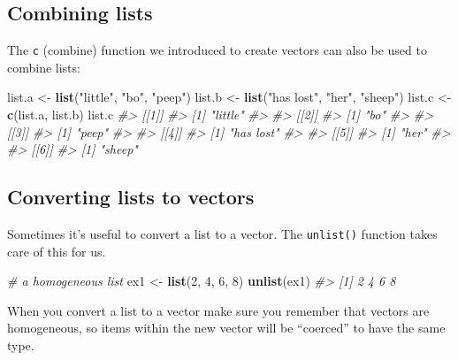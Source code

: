 \documentclass[]{book}
\newenvironment{Shaded}{\begin{snugshade}}{\end{snugshade}}
\newcommand{\CommentTok}[1]{\textcolor[rgb]{0.56,0.35,0.01}{\textit{#1}}}
\newcommand{\DecValTok}[1]{\textcolor[rgb]{0.00,0.00,0.81}{#1}}
\newcommand{\KeywordTok}[1]{\textcolor[rgb]{0.13,0.29,0.53}{\textbf{#1}}}
\newcommand{\NormalTok}[1]{#1}
\newcommand{\StringTok}[1]{\textcolor[rgb]{0.31,0.60,0.02}{#1}}
\theoremstyle{definition}
\theoremstyle{definition}
\theoremstyle{definition}
\theoremstyle{remark}
\begin{document}
\hypertarget{combining-lists}{%
\subsection{Combining lists}\label{combining-lists}}

The \texttt{c} (combine) function we introduced to create vectors can
also be used to combine lists:

\begin{Shaded}
\begin{Highlighting}[]
\NormalTok{list.a <-}\StringTok{ }\KeywordTok{list}\NormalTok{(}\StringTok{"little"}\NormalTok{, }\StringTok{"bo"}\NormalTok{, }\StringTok{"peep"}\NormalTok{)}
\NormalTok{list.b <-}\StringTok{ }\KeywordTok{list}\NormalTok{(}\StringTok{"has lost"}\NormalTok{, }\StringTok{"her"}\NormalTok{, }\StringTok{"sheep"}\NormalTok{)}
\NormalTok{list.c <-}\StringTok{ }\KeywordTok{c}\NormalTok{(list.a, list.b)}
\NormalTok{list.c}
\CommentTok{#> [[1]]}
\CommentTok{#> [1] "little"}
\CommentTok{#> }
\CommentTok{#> [[2]]}
\CommentTok{#> [1] "bo"}
\CommentTok{#> }
\CommentTok{#> [[3]]}
\CommentTok{#> [1] "peep"}
\CommentTok{#> }
\CommentTok{#> [[4]]}
\CommentTok{#> [1] "has lost"}
\CommentTok{#> }
\CommentTok{#> [[5]]}
\CommentTok{#> [1] "her"}
\CommentTok{#> }
\CommentTok{#> [[6]]}
\CommentTok{#> [1] "sheep"}
\end{Highlighting}
\end{Shaded}

\hypertarget{converting-lists-to-vectors}{%
\subsection{Converting lists to
vectors}\label{converting-lists-to-vectors}}

Sometimes it's useful to convert a list to a vector. The
\texttt{unlist()} function takes care of this for us.

\begin{Shaded}
\begin{Highlighting}[]
\CommentTok{# a homogeneous list}
\NormalTok{ex1 <-}\StringTok{ }\KeywordTok{list}\NormalTok{(}\DecValTok{2}\NormalTok{, }\DecValTok{4}\NormalTok{, }\DecValTok{6}\NormalTok{, }\DecValTok{8}\NormalTok{)}
\KeywordTok{unlist}\NormalTok{(ex1)}
\CommentTok{#> [1] 2 4 6 8}
\end{Highlighting}
\end{Shaded}

When you convert a list to a vector make sure you remember that vectors
are homogeneous, so items within the new vector will be ``coerced'' to
have the same type.
\end{document}
